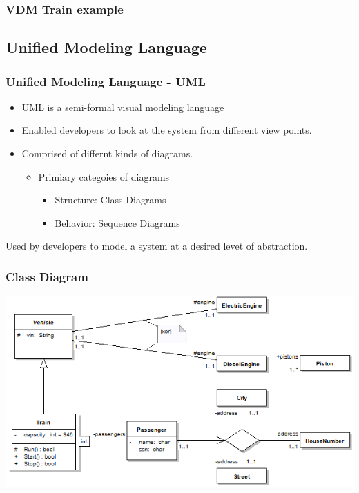 %
%
\frame
{
  \frametitle{VDM Train example}

\begin{center}


\end{center}
}

\subsection{Unified Modeling Language}
%
%
\frame
{
  \frametitle{Unified Modeling Language - UML}

	\begin{itemize}
  		\item UML is a semi-formal visual modeling language
  		\item Enabled developers to look at the system from different view points.
  		\item Comprised of differnt kinds of diagrams.
		\begin{itemize}
			\item Primiary categoies of diagrams
			\begin{itemize}
				\item Structure: Class Diagrams
				\item Behavior: Sequence Diagrams
			\end{itemize}
		\end{itemize}
  		 
	  	
  \end{itemize}

}

\note
{
Used by developers to model a system at a desired levet of abstraction.



}


%
%
\frame
{
  \frametitle{Class Diagram}

\begin{center}

\includegraphics[width=\textwidth]{images/ClassDiagramOverview.png}

\end{center}
}


